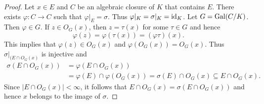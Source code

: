\begin{proof}
    Let $x\in E$ and 
    $C$ be an algebraic closure of $K$ that contains $E$. There
    exists $\varphi\colon C\to C$ such that $\varphi|_E=\sigma$. 
    Thus $\varphi|_K=\sigma|_K=\operatorname{id}_K$. Let $G=\operatorname{Gal}(C/K)$. Then  
    $\varphi\in G$. If $z\in O_G(x)$, 
    then $z=\tau(x)$ for some $\tau\in G$ and hence
    \[
    \varphi(z)=\varphi(\tau(x))=(\varphi\tau)(x). 
    \]
    This implies that $\varphi(z)\in O_G(x)$ 
    and $\varphi(O_G(x))=O_G(x)$. Thus $\sigma|_{(E\cap O_G(x)}$ is injective 
    and 
    \begin{align*}
        \sigma(E\cap O_G(x))&=\varphi(E\cap O_G(x))\\
        &=\varphi(E)\cap\varphi(O_G(x))
        =\sigma(E)\cap O_G(x)\subseteq E\cap O_G(x).
        \end{align*}
    Since $|E\cap O_G(x)|<\infty$, it follows that $E\cap O_G(x)=\sigma(E\cap O_G(x))$ and
    hence $x$ belongs to the image of $\sigma$. 
\end{proof}

